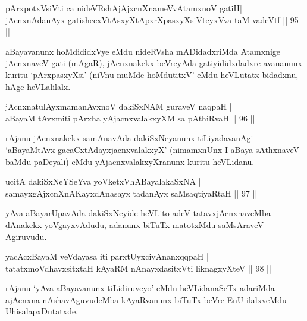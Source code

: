 
\begin{shl}
pArxpotxV\s siVti ca nideVRshAjAjxcnXnameVvA\s \s tamxnoV gatiH|\\
jAcnxnAdanAyx gatishecxVtAsxyXtApxrXpasxyXsiVteyxVva taM vadeVtf \hfill || 95 || 
\end{shl}

\begin{artha}
aBayavanunx hoMdididxVye eMdu nideRVsha mADidadxriMda Atamxnige jAcnxnaveV gati (mAgaR), jAcnxnakekx beVreyAda gatiyididxdadxre avananunx kuritu `pArxpasxyXsi' (niVnu muMde hoMdutitxV' eMdu heVLutatx bidadxnu, hAge heVLalilalx.
\end{artha}

\begin{shl}
jAcnxnatulAyxmamanAvxnoV dakiSxNAM guraveV naqpaH |\\
aBayaM tAvxmiti pArxha yAjacnxvalakxyXM sa pAthiRvaH \hfill || 96 || 
\end{shl}

\begin{artha}
rAjanu jAcnxnakekx samAnavAda dakiSxNeyanunx tiLiyadavanAgi `aBayaMtAvx gacaCxtAdayxjacnxvalakxyX' (nimamxnUnx I aBaya sAthxnaveV baMdu paDeyali) eMdu yAjacnxvalakxyXranunx kuritu heVLidanu.
\end{artha}

\begin{shl}
ucitA dakiSxNeYSeYva yoVketxVhABayalakaSxNA |\\
samayxgAjxcnXnAKayxdAnasayx tadanAyx saMsaqtiyaRtaH \hfill || 97 || 
\end{shl}

\begin{artha}
yAva aBayarUpavAda dakiSxNeyide heVLito adeV tatavxjAcnxnaveMba dAnakekx yoVgayxvAdudu, adanunx biTuTx matotxMdu saMsAraveV Agiruvudu.
\end{artha}


\begin{shl}
yacAcxBayaM veVdayasa iti parxtUyxcivAnanxqqpaH |\\
tatatxmoVdhavxsitxtaH kAyaRM nAnayxdasitxVti liknagxyXteV \hfill || 98 || 
\end{shl}

\begin{artha}
rAjanu `yAva aBayavanunx tiLidiruveyo' eMdu heVLidanaSeTx adariMda ajAcnxna nAshavAguvudeMba kAyaRvanunx biTuTx beVre EnU ilalxveMdu UhisalapxDutatxde.
\end{artha}

